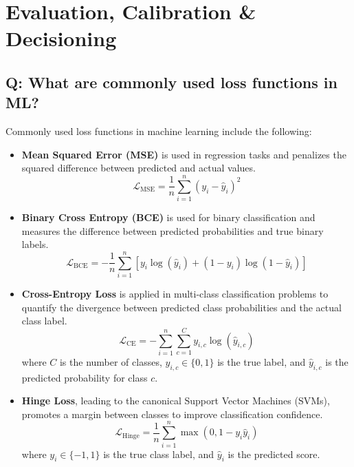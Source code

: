 \section{Evaluation, Calibration \& Decisioning}

\subsection*{Q: What are commonly used loss functions in ML?}
Commonly used loss functions in machine learning include the following:
\begin{itemize}
	\item \textbf{Mean Squared Error (MSE)} is used in regression tasks and penalizes the squared difference between predicted and actual values.
	      \[
		      \mathcal{L}_{\text{MSE}} = \frac{1}{n} \sum_{i=1}^{n} (y_i - \hat{y}_i)^2
	      \]

	\item \textbf{Binary Cross Entropy (BCE)} is used for binary classification and measures the difference between predicted probabilities and true binary labels.
	      \[
		      \mathcal{L}_{\text{BCE}} = - \frac{1}{n} \sum_{i=1}^{n} \left[ y_i \log(\hat{y}_i) + (1 - y_i) \log(1 - \hat{y}_i) \right]
	      \]

	\item \textbf{Cross-Entropy Loss} is applied in multi-class classification problems to quantify the divergence between predicted class probabilities and the actual class label.
	      \[
		      \mathcal{L}_{\text{CE}} = - \sum_{i=1}^{n} \sum_{c=1}^{C} y_{i,c} \log(\hat{y}_{i,c})
	      \]
	      where \( C \) is the number of classes, \( y_{i,c} \in \{0,1\} \) is the true label, and \( \hat{y}_{i,c} \) is the predicted probability for class \( c \).

	\item \textbf{Hinge Loss}, leading to the canonical Support Vector Machines (SVMs), promotes a margin between classes to improve classification confidence.
	      \[
		      \mathcal{L}_{\text{Hinge}} = \frac{1}{n} \sum_{i=1}^{n} \max(0, 1 - y_i \hat{y}_i)
	      \]
	      where \( y_i \in \{-1, 1\} \) is the true class label, and \( \hat{y}_i \) is the predicted score.
\end{itemize}

